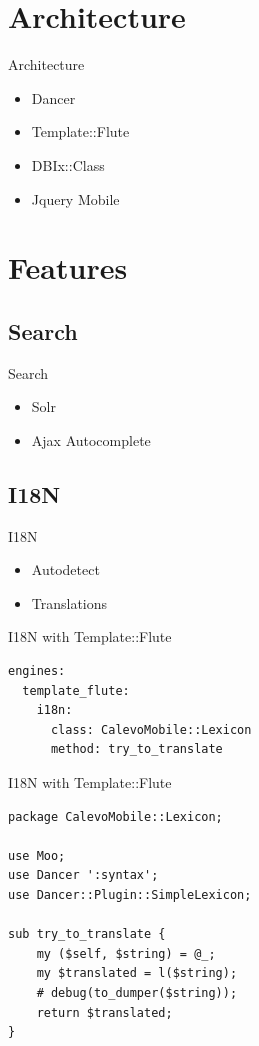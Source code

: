 \section{Architecture}
\begin{frame}{Architecture}
\begin{itemize}
\item Dancer
\item Template::Flute
\item DBIx::Class
\item Jquery Mobile
\end{itemize}
\end{frame}

\section{Features}


\subsection{Search}
\begin{frame}{Search}
\begin{itemize}
\item Solr
\item Ajax Autocomplete
\end{itemize}
\end{frame}

\subsection{I18N}
\begin{frame}{I18N}
\begin{itemize}
\item Autodetect
\item Translations
\end{itemize}
\end{frame}

\begin{frame}[fragile]{I18N with Template::Flute}
\begin{lstlisting}
engines:
  template_flute:
    i18n:
      class: CalevoMobile::Lexicon
      method: try_to_translate
\end{lstlisting}
\end{frame}

\begin{frame}[fragile]{I18N with Template::Flute}
\begin{lstlisting}
package CalevoMobile::Lexicon;

use Moo;
use Dancer ':syntax';
use Dancer::Plugin::SimpleLexicon;

sub try_to_translate {
    my ($self, $string) = @_;
    my $translated = l($string);
    # debug(to_dumper($string));
    return $translated;
}
\end{lstlisting}
\end{frame}


